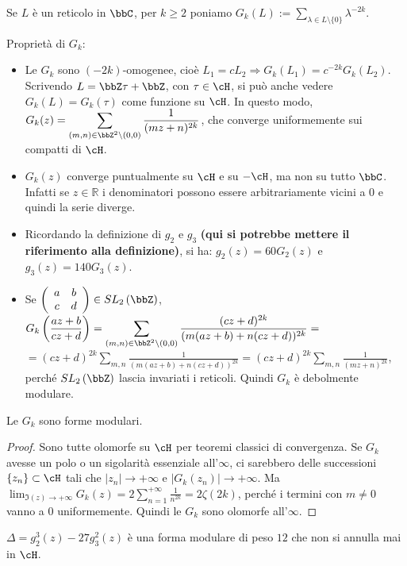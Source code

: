 \begin{definizione}
Se $L$ è un reticolo in $\bbC$, per $k \geq 2$ poniamo
$G_k(L):=\displaystyle{\sum_{\lambda \in L \setminus \{ 0 \}}{\lambda ^{-2k}}}$.
\end{definizione}

\begin{osservazione}
Proprietà di $G_k$:

\begin{itemize}
\item Le $G_k$ sono $(-2k)$-omogenee, cioè
$L_1=cL_2 \Rightarrow G_k(L_1)=c^{-2k}G_k(L_2)$.
Scrivendo $L=\bbZ \tau + \bbZ$, con $\tau \in \cH$,
si può anche vedere $G_k(L) = G_k(\tau)$ come funzione su $\cH$.
In questo modo, $\displaystyle{G_k(z)=\sum_{(m,n) \in \bbZ^2 \setminus
(0,0)}{\frac{1}{(mz+n)^{2k}}}}$, che converge uniformemente sui compatti
di $\cH$.
\item $G_k(z)$ converge puntualmente su $\cH$ e su $-\cH$, ma non su tutto $\bbC$. Infatti se $z \in \mathbb{R}$ i denominatori possono
essere arbitrariamente vicini a $0$ e quindi la serie diverge.
\item Ricordando la definizione di $g_2$ e $g_3$ \textbf{\textcolor[rgb]{1,0,0}{(qui si potrebbe mettere il riferimento alla definizione)}}, si ha: $g_2(z)=60G_2(z)$ e $g_3(z)=140G_3(z)$.
\item Se $\left( \begin{array}{cc} a & b \\ c & d \end{array} \right) \in
SL_2 \left( \bbZ \right)$,
$\displaystyle{ G_k \left(\frac{az+b}{cz+d} \right) = 
\sum_{(m,n) \in \bbZ^2 \setminus (0,0)}
{\frac{(cz+d)^{2k}} {(m(az+b)+n(cz+d))^{2k}}} =}$
$\displaystyle{ =(cz+d)^{2k} \sum_{m,n}{\frac{1} {(m(az+b)+n(cz+d))^{2k}}} =
(cz+d)^{2k} \sum_{m,n}{\frac{1}{(mz+n)^{2k}}} }$, perché
$SL_2 \left( \bbZ \right)$ lascia invariati i reticoli. Quindi $G_k$
è debolmente modulare.
\end{itemize}
\end{osservazione}


\begin{proposizione}
Le $G_k$ sono forme modulari.
\end{proposizione}

\begin{proof}
Sono tutte olomorfe su $\cH$ per teoremi classici di convergenza.
Se $G_k$ avesse un polo o un sigolarità essenziale all'$\infty$, ci sarebbero
delle successioni $\{ z_n \} \subset \cH$ tali che
$|z_n| \rightarrow +\infty$ e $|G_k(z_n)| \rightarrow +\infty$.
Ma $\displaystyle{\lim_{\Im(z) \rightarrow +\infty} G_k(z)=
2 \sum_{n=1}^{+\infty}{\frac{1}{n^{2k}}} = 2 \zeta(2k)}$, perché i termini
con $m \neq 0$ vanno a $0$ uniformemente. Quindi le $G_k$ sono olomorfe
all'$\infty$.
\end{proof}

\begin{osservazione}
$\Delta = g_2 ^3 (z) - 27 g_3 ^2 (z)$ è una forma modulare di peso $12$ che
non si annulla mai in $\cH$.
\end{osservazione}